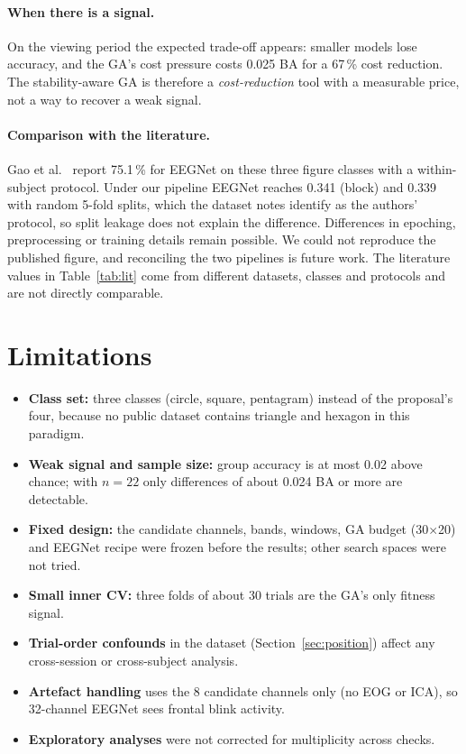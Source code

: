 \documentclass[11pt,a4paper]{article}
\begin{document}
\paragraph{When there is a signal.} On the viewing period the expected trade-off appears: smaller models
lose accuracy, and the GA's cost pressure costs 0.025 BA for a 67\,\% cost reduction. The stability-aware
GA is therefore a \emph{cost-reduction} tool with a measurable price, not a way to recover a weak signal.

\paragraph{Comparison with the literature.} Gao et al.~\cite{gao2026} report 75.1\,\% for EEGNet on these
three figure classes with a within-subject protocol. Under our pipeline EEGNet reaches 0.341 (block) and
0.339 with random 5-fold splits, which the dataset notes identify as the authors' protocol, so split
leakage does not explain the difference. Differences in epoching, preprocessing or training details remain
possible. We could not reproduce the published figure, and reconciling the two pipelines is future work.
The literature values in Table~\ref{tab:lit} come from different datasets, classes and protocols and are
not directly comparable.

\section{Limitations}
\begin{itemize}
  \item \textbf{Class set:} three classes (circle, square, pentagram) instead of the proposal's four,
        because no public dataset contains triangle and hexagon in this paradigm.
  \item \textbf{Weak signal and sample size:} group accuracy is at most 0.02 above chance; with $n=22$
        only differences of about 0.024 BA or more are detectable.
  \item \textbf{Fixed design:} the candidate channels, bands, windows, GA budget (30$\times$20) and
        EEGNet recipe were frozen before the results; other search spaces were not tried.
  \item \textbf{Small inner CV:} three folds of about 30 trials are the GA's only fitness signal.
  \item \textbf{Trial-order confounds} in the dataset (Section~\ref{sec:position}) affect any
        cross-session or cross-subject analysis.
  \item \textbf{Artefact handling} uses the 8 candidate channels only (no EOG or ICA), so 32-channel
        EEGNet sees frontal blink activity.
  \item \textbf{Exploratory analyses} were not corrected for multiplicity across checks.
\end{itemize}
\end{document}
